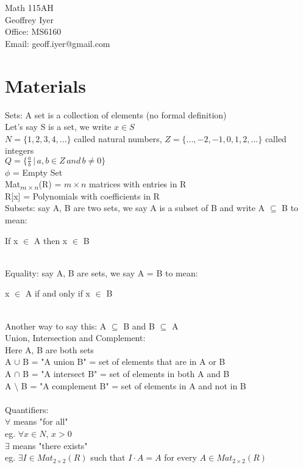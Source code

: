 \documentclass{article}
\begin{document}
\doublespacing
{\center Math 115AH \\ Geoffrey Iyer \\ Office: MS6160 \\ Email: geoff.iyer@gmail.com} \\
\section{Materials}
Sets: A set is a collection of elements (no formal definition)\\
Let's say S is a set, we write $x \in S$ \\
$N = \{1, 2, 3, 4, ...\}$ called natural numbers, $Z = \{..., -2, -1, 0, 1, 2, ...\}$ called integers\\
$Q = \{\frac{a}{b} \,|\, a, b \in Z \, and \, b \neq 0\}$ \\
$\phi$ = Empty Set \\
Mat\textsubscript{$m\times n$}(R) = $m \times n$ matrices with entries in R\\ 
R[x] = Polynomials with coefficients in R \\
Subsets: say A, B are two sets, we say A is a subset of B and write A $\subseteq$ B to mean: \\
\centerline{If x $\in$ A then x $\in$ B} \\
Equality: say A, B are sets, we say A = B to mean: \\
\centerline{x $\in$ A if and only if x $\in$ B}\\
 Another way to say this: A $\subseteq$ B and B $\subseteq$ A\\
 Union, Intersection and Complement: \\
 Here A, B are both sets\\
 A $\cup$ B = "A union B" = set of elements that are in A or B\\
 A $\cap$ B = "A intersect B" = set of elements in both A and B\\
 A $\setminus$ B = "A complement B" = set of elements in A and not in B\\
 \\
 Quantifiers: \\
 $\forall$ means "for all"\\
 eg. $\forall x \in N$, $x > 0$\\
 $\exists$ means "there exists"\\
 eg. $\exists I \in Mat_{2\times 2}(R)$ such that $I \cdot A = A$ for every $A \in Mat_{2\times 2}(R)$
 
\end{document}
